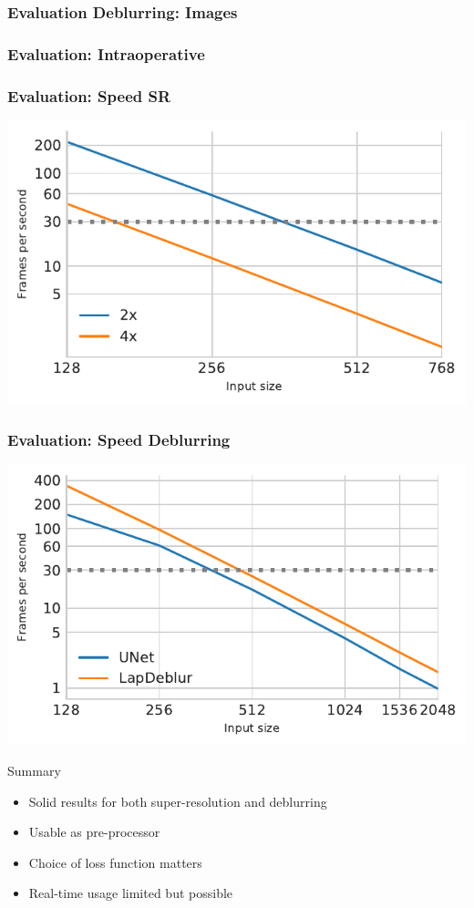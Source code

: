\documentclass{beamer}
\begin{document}
\begin{frame} \frametitle{Evaluation Deblurring: Images}

\end{frame}


\begin{frame}
  \frametitle{Evaluation: Intraoperative}
  
\end{frame}

\begin{frame} \frametitle{Evaluation: Speed SR}
  \includegraphics{time_upscaling_beamer}

\end{frame}

\begin{frame} \frametitle{Evaluation: Speed Deblurring}
  \includegraphics{time_denoising_beamer}
\end{frame}


\begin{frame}{Summary}
\begin{itemize}
  \item Solid results for both super-resolution and deblurring
  \item Usable as pre-processor
  \item Choice of loss function matters
  \item Real-time usage limited but possible
\end{itemize}

\end{frame}
\end{document}
